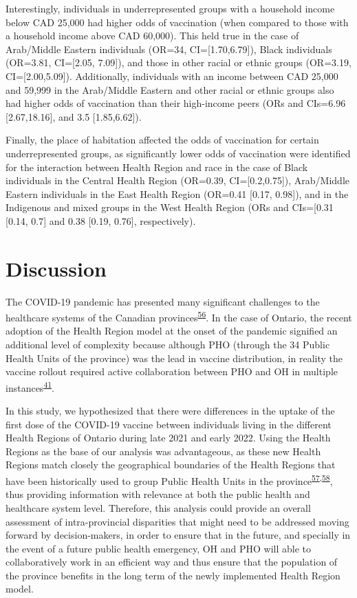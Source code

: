 \documentclass[
]{article}
\begin{document}
Interestingly, individuals in underrepresented groups with a household
income below CAD 25,000 had higher odds of vaccination (when compared to
those with a household income above CAD 60,000). This held true in the
case of Arab/Middle Eastern individuals (OR=34, CI={[}1.70,6.79{]}),
Black individuals (OR=3.81, CI={[}2.05, 7.09{]}), and those in other
racial or ethnic groups (OR=3.19, CI={[}2.00,5.09{]}). Additionally,
individuals with an income between CAD 25,000 and 59,999 in the
Arab/Middle Eastern and other racial or ethnic groups also had higher
odds of vaccination than their high-income peers (ORs and CIs=6.96
{[}2.67,18.16{]}, and 3.5 {[}1.85,6.62{]}).

Finally, the place of habitation affected the odds of vaccination for
certain underrepresented groups, as significantly lower odds of
vaccination were identified for the interaction between Health Region
and race in the case of Black individuals in the Central Health Region
(OR=0.39, CI={[}0.2,0.75{]}), Arab/Middle Eastern individuals in the
East Health Region (OR=0.41 {[}0.17, 0.98{]}), and in the Indigenous and
mixed groups in the West Health Region (ORs and CIs={[}0.31 {[}0.14,
0.7{]} and 0.38 {[}0.19, 0.76{]}, respectively).

\hypertarget{discussion}{%
\section{Discussion}\label{discussion}}

The COVID-19 pandemic has presented many significant challenges to the
healthcare systems of the Canadian
provinces\textsuperscript{\protect\hyperlink{ref-alami2021}{56}}. In the
case of Ontario, the recent adoption of the Health Region model at the
onset of the pandemic signified an additional level of complexity
because although PHO (through the 34 Public Health Units of the
province) was the lead in vaccine distribution, in reality the vaccine
rollout required active collaboration between PHO and OH in multiple
instances\textsuperscript{\protect\hyperlink{ref-ashcroft2023}{41}}.

In this study, we hypothesized that there were differences in the uptake
of the first dose of the COVID-19 vaccine between individuals living in
the different Health Regions of Ontario during late 2021 and early 2022.
Using the Health Regions as the base of our analysis was advantageous,
as these new Health Regions match closely the geographical boundaries of
the Health Regions that have been historically used to group Public
Health Units in the
province\textsuperscript{\protect\hyperlink{ref-bolotin2018}{57},\protect\hyperlink{ref-ohesi}{58}},
thus providing information with relevance at both the public health and
healthcare system level. Therefore, this analysis could provide an
overall assessment of intra-provincial disparities that might need to be
addressed moving forward by decision-makers, in order to ensure that in
the future, and specially in the event of a future public health
emergency, OH and PHO will able to collaboratively work in an efficient
way and thus ensure that the population of the province benefits in the
long term of the newly implemented Health Region model.
\end{document}
